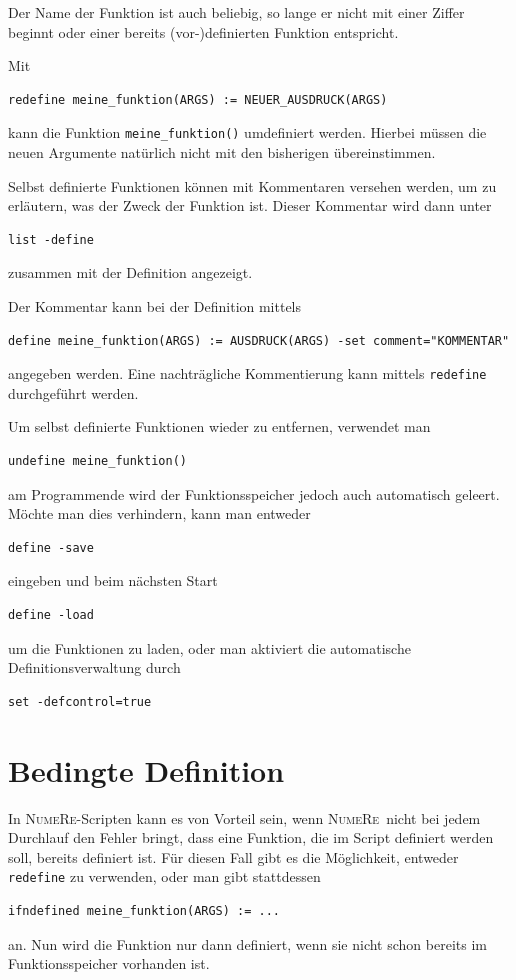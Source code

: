 \documentclass[DIV=14,headsepline,footsepline]{scrbook}
\newcommand{\NR}{\textsc{Nu\-me\-Re}}
\begin{document}
				Der Name der Funktion ist auch beliebig, so lange er nicht mit einer Ziffer beginnt oder einer bereits (vor-)definierten Funktion entspricht.
				
				Mit
				\begin{lstlisting}
redefine meine_funktion(ARGS) := NEUER_AUSDRUCK(ARGS)
				\end{lstlisting}
				kann die Funktion \verb+meine_funktion()+ umdefiniert werden. Hierbei müssen die neuen Argumente natürlich nicht mit den bisherigen übereinstimmen.
				
				Selbst definierte Funktionen können mit Kommentaren versehen werden, um zu erläutern, was der Zweck der Funktion ist. Dieser Kommentar wird dann unter
				\begin{lstlisting}
list -define
				\end{lstlisting}
				zusammen mit der Definition angezeigt.
				
				Der Kommentar kann bei der Definition mittels
				\begin{lstlisting}
define meine_funktion(ARGS) := AUSDRUCK(ARGS) -set comment="KOMMENTAR"
				\end{lstlisting}
				angegeben werden. Eine nachträgliche Kommentierung kann mittels \verb+redefine+ durchgeführt werden.
				
				Um selbst definierte Funktionen wieder zu entfernen, verwendet man
				\begin{lstlisting}
undefine meine_funktion()
				\end{lstlisting}
				am Programmende wird der Funktionsspeicher jedoch auch automatisch geleert. Möchte man dies verhindern, kann man entweder
				\begin{lstlisting}
define -save
				\end{lstlisting}
				eingeben und beim nächsten Start
				\begin{lstlisting}
define -load
				\end{lstlisting}
				um die Funktionen zu laden, oder man aktiviert die automatische Definitionsverwaltung durch
				\begin{lstlisting}
set -defcontrol=true
				\end{lstlisting}
				
			\section{Bedingte Definition}
				In \NR-Scripten kann es von Vorteil sein, wenn \NR\ nicht bei jedem Durchlauf den Fehler bringt, dass eine Funktion, die im Script definiert werden soll, bereits definiert ist. Für diesen Fall gibt es die Möglichkeit, entweder \verb+redefine+ zu verwenden, oder man gibt stattdessen
				\begin{lstlisting}
ifndefined meine_funktion(ARGS) := ...
				\end{lstlisting}
				an. Nun wird die Funktion nur dann definiert, wenn sie nicht schon bereits im Funktionsspeicher vorhanden ist.
\end{document}
